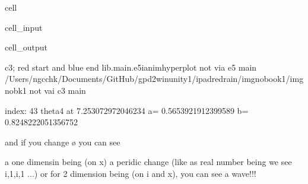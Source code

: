 \documentclass[letterpaper,10pt,english]{jupyterBook}
\begin{document}
\begin{sphinxuseclass}{cell}\begin{sphinxVerbatimInput}

\begin{sphinxuseclass}{cell_input}
\begin{sphinxVerbatim}[commandchars=\\\{\}]
 
 
   
\end{sphinxVerbatim}

\end{sphinxuseclass}\end{sphinxVerbatimInput}
\begin{sphinxVerbatimOutput}

\begin{sphinxuseclass}{cell_output}
\begin{sphinxVerbatim}[commandchars=\\\{\}]
c3; red start and blue end
lib.main.e5\PYGZus{}i\PYGZus{}anim\PYGZus{}hyperplot
not via e5 main
/Users/ngcchk/Documents/GitHub/gpd2\PYGZhy{}win\PYGZhy{}unity1/ipadred\PYGZhy{}rain/imgno\PYGZus{}book1/imgnobk1
not vai c3 main

index: 43 
theta4 at  7.253072972046234 
 a= 0.5653921912399589  b= 0.8248222051356752 
\end{sphinxVerbatim}

\noindent{}

\end{sphinxuseclass}\end{sphinxVerbatimOutput}

\end{sphinxuseclass}
\begin{sphinxVerbatim}[commandchars=\\\{\}]
and if you change ø you can see 

\PYGZhy{} a one dimensin being (on x) a peridic change (like as real number being we see i,\PYGZhy{}1,\PYGZhy{}i,1 ...)
\PYGZhy{} or for 2 dimension being (on i and x), you can see a wave!!!
\end{sphinxVerbatim}
\end{document}
